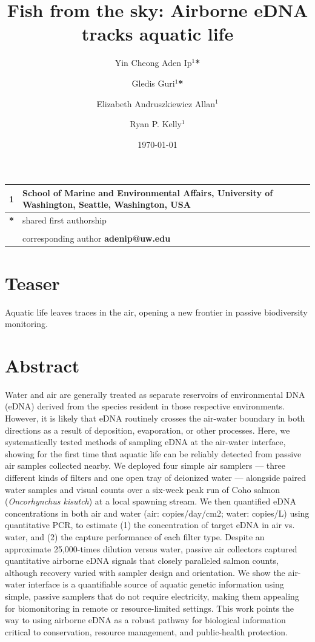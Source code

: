 \documentclass{article}
\title{Fish from the sky: Airborne eDNA tracks aquatic life}
\author{Yin Cheong Aden Ip$^1$\textbf{*} \and
Gledis Guri$^1$\textbf{*} \and
Elizabeth Andruszkiewicz Allan$^1$ \and
Ryan P. Kelly$^1$}
\date{\today}
\begin{document}
\maketitle

\section*{}

\begin{center}
\begin{tabular}{ll}
1 & School of Marine and Environmental Affairs, University of Washington, Seattle, Washington, USA \\
\hline
\textbf{*} & shared first authorship\\
&\\
& corresponding author \textbf{adenip@uw.edu}
\end{tabular}
\end{center}

\section*{Teaser}
Aquatic life leaves traces in the air, opening a new frontier in passive biodiversity monitoring.

\section*{Abstract}
Water and air are generally treated as separate reservoirs of environmental DNA (eDNA) derived from the species resident in those respective environments. However, it is likely that eDNA routinely crosses the air-water boundary in both directions as a result of deposition, evaporation, or other processes. Here, we systematically tested methods of sampling eDNA at the air-water interface, showing for the first time that aquatic life can be reliably detected from passive air samples collected nearby. We deployed four simple air samplers — three different kinds of filters and one open tray of deionized water — alongside paired water samples and visual counts over a six-week peak run of Coho salmon (\textit{Oncorhynchus kisutch}) at a local spawning stream. We then quantified eDNA concentrations in both air and water (air: copies/day/cm2; water: copies/L) using quantitative PCR, to estimate (1) the concentration of target eDNA in air vs. water, and (2) the capture performance of each filter type. Despite an approximate 25,000-times dilution versus water, passive air collectors captured quantitative airborne eDNA signals that closely paralleled salmon counts, although recovery varied with sampler design and orientation. We show the air-water interface is a quantifiable source of aquatic genetic information using simple, passive samplers that do not require electricity, making them appealing for biomonitoring in remote or resource-limited settings. This work points the way to using airborne eDNA as a robust pathway for biological information critical to conservation, resource management, and public-health protection.
\end{document}
